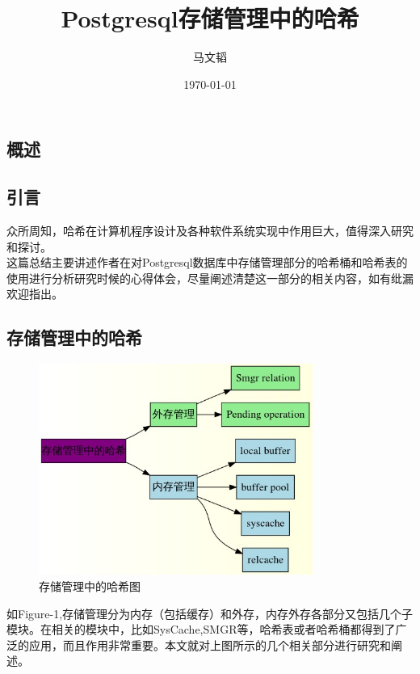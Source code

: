 \documentclass{article}
\title{Postgresql存储管理中的哈希} %
\author{马文韬} %
\date{\today} %
\begin{document}
\begin{CJK*}{UTF8}{gkai}

\maketitle %

\section{概述}
\subsection{引言}
\indent 众所周知，哈希在计算机程序设计及各种软件系统实现中作用巨大，值得深入研究和探讨。\\
\indent 这篇总结主要讲述作者在对Postgresql数据库中存储管理部分的哈希桶和哈希表的使用进行分析研究时候的心得体会，尽量阐述清楚这一部分的相关内容，如有纰漏欢迎指出。
\subsection{存储管理中的哈希}
\begin{figure}[H]
\centering
\includegraphics[width = 0.8\textwidth]{index.jpg}
\caption{存储管理中的哈希图}
\label{overflow}
\end{figure}
\indent 如Figure-1,存储管理分为内存（包括缓存）和外存，内存外存各部分又包括几个子模块。在相关的模块中，比如SysCache,SMGR等，哈希表或者哈希桶都得到了广泛的应用，而且作用非常重要。本文就对上图所示的几个相关部分进行研究和阐述。











\end{CJK*}
\end{document}
